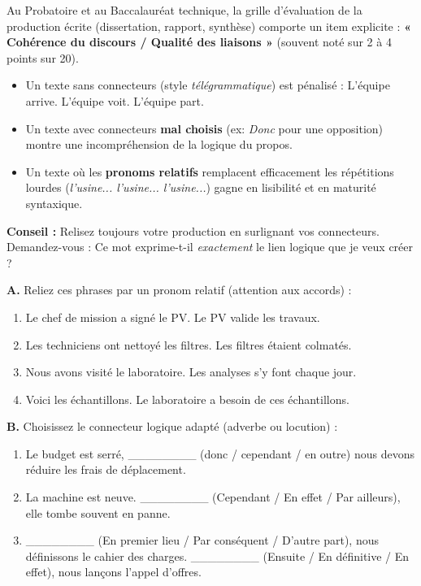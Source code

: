 \documentclass[11pt]{article}
\begin{document}
\begin{savaistu}
Au Probatoire et au Baccalauréat technique, la grille d'évaluation de la production écrite (dissertation, rapport, synthèse) comporte un item explicite : \textbf{« Cohérence du discours / Qualité des liaisons »} (souvent noté sur 2 à 4 points sur 20).
\begin{itemize}
    \item Un texte sans connecteurs (style \emph{télégrammatique}) est pénalisé : \og L'équipe arrive. L'équipe voit. L'équipe part.\fg
    \item Un texte avec connecteurs \textbf{mal choisis} (ex: \emph{Donc} pour une opposition) montre une incompréhension de la logique du propos.
    \item Un texte où les \textbf{pronoms relatifs} remplacent efficacement les répétitions lourdes (\emph{l'usine... l'usine... l'usine...}) gagne en lisibilité et en maturité syntaxique.
\end{itemize}
\textbf{Conseil :} Relisez toujours votre production en surlignant vos connecteurs. Demandez-vous : \og Ce mot exprime-t-il \emph{exactement} le lien logique que je veux créer ?\fg
\end{savaistu}

\begin{exercice}
\textbf{A.} Reliez ces phrases par un pronom relatif (attention aux accords) :
\begin{enumerate}
    \item Le chef de mission a signé le PV. Le PV valide les travaux.
    \item Les techniciens ont nettoyé les filtres. Les filtres étaient colmatés.
    \item Nous avons visité le laboratoire. Les analyses s'y font chaque jour.
    \item Voici les échantillons. Le laboratoire a besoin de ces échantillons.
\end{enumerate}

\textbf{B.} Choisissez le connecteur logique adapté (adverbe ou locution) :
\begin{enumerate}
    \item Le budget est serré, \_\_\_\_\_\_\_\_ (donc / cependant / en outre) nous devons réduire les frais de déplacement.
    \item La machine est neuve. \_\_\_\_\_\_\_\_ (Cependant / En effet / Par ailleurs), elle tombe souvent en panne.
    \item \_\_\_\_\_\_\_\_ (En premier lieu / Par conséquent / D'autre part), nous définissons le cahier des charges. \_\_\_\_\_\_\_\_ (Ensuite / En définitive / En effet), nous lançons l'appel d'offres.
\end{enumerate}
\end{exercice}
\end{document}
